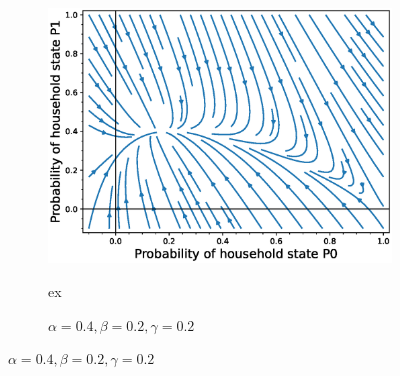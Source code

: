 \documentclass[paper=a4, fontsize=11pt, twoside, BCOR=12mm, parskip=full, listof=totoc]{scrreprt}
\begin{document}
{\begin{figure}[H]
\begin{subfigure}[b]{0.4\linewidth}
	  \includegraphics[width=\linewidth]{phase_portrait/01g1s.eps}
	  \caption{\(\alpha=0.4, \beta=0.2, \gamma=0.2\)}
	  \label{beta two phasestreamplot}ex


\end{subfigure}
\end{figure}}
\end{document}
